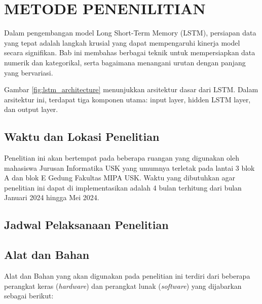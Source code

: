 \chapter{METODE PENENILITIAN}

\par Dalam pengembangan model Long Short-Term Memory (LSTM), persiapan data yang tepat adalah langkah krusial yang dapat mempengaruhi kinerja model secara signifikan. Bab ini membahas berbagai teknik untuk mempersiapkan data numerik dan kategorikal, serta bagaimana menangani urutan dengan panjang yang bervariasi.
\par Gambar \ref{fig:lstm_architecture} menunjukkan arsitektur dasar dari LSTM. Dalam arsitektur ini, terdapat tiga komponen utama: input layer, hidden LSTM layer, dan output layer.

\section{Waktu dan Lokasi Penelitian}
Penelitian ini akan bertempat pada beberapa ruangan yang digunakan oleh mahasiswa Jurusan Informatika USK yang umumnya terletak pada lantai 3 blok A dan blok E Gedung Fakultas MIPA USK. Waktu yang dibutuhkan agar penelitian ini dapat di implementasikan adalah 4 bulan terhitung dari bulan Januari 2024 hingga Mei 2024.
\section{Jadwal Pelaksanaan Penelitian}

\section{Alat dan Bahan}
Alat dan Bahan yang akan digunakan pada penelitian ini terdiri dari beberapa perangkat keras (\textit{hardware}) dan perangkat lunak (\textit{software}) yang dijabarkan sebagai berikut:

